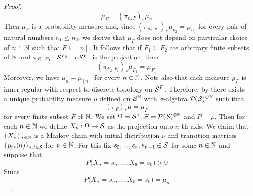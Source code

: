 \begin{proof}
$$\mu_F = \left(\pi_{n,F}\right)_*\mu_n$$
Then $\mu_F$ is a probability measure and, since $\left(\pi_{n_2,n_1}\right)_*\mu_{n_2} = \mu_{n_1}$ for every pair of natural numbers $n_1\leq n_2$, we derive that $\mu_F$ does not depend on particular choice of $n\in {\mathbb N}$ such that $F\subseteq [n]$. It follows that if $F_1\subseteq F_2$ are arbitrary finite subsets of ${\mathbb N}$ and $\pi_{F_2,F_1}:{\mathcal S}^{F_2}\rightarrow {\mathcal S}^{F_1}$ is the projection, then 
$$\left(\pi_{F_2,F_1}\right)_*\mu_{F_2} = \mu_{F_1}$$
Moreover, we have $\mu_n = \mu_{[n]}$ for every $n\in {\mathbb N}$. Note also that each measure $\mu_F$ is inner regular with respect to discrete topology on ${\mathcal S}^F$. Therefore, by {\cite[Theorem 2.2]{Daniell_Kolmogorov_extension}} there exists a unique probability measure $\mu$ defined on ${\mathcal S}^{{\mathbb N}}$ with $\sigma$-algebra ${\mathcal P}({\mathcal S})^{\otimes {\mathbb N}}$ such that
$$\left(\pi_F\right)_*\mu = \mu_F$$
for every finite subset $F$ of ${\mathbb N}$. We set $\Omega = {\mathcal S}^{{\mathbb N}},{\mathcal F} = {\mathcal P}({\mathcal S})^{\otimes {\mathbb N}}$ and $P = \mu$. Then for each $n\in {\mathbb N}$ we define $X_n:\Omega\rightarrow {\mathcal S}$ as the projection onto $n$-th axis. We claim that $\{X_n\}_{n\in {\mathbb N}}$ is a Markov chain with initial distribution $\nu$ and transition matrices $\{p_{ts}(n)\}_{s,t\in {\mathcal S}}$ for $n\in {\mathbb N}$. For this fix $s_0,...,s_n,s_{n+1}\in {\mathcal S}$ for some $n\in {\mathbb N}$ and suppose that 
$$P\big(X_n=s_n,...,X_0=s_0\big) > 0$$
Since
$$P\big(X_n=s_n,...,X_0=s_0\big) = \mu_n$$
\end{proof}


























\small


























